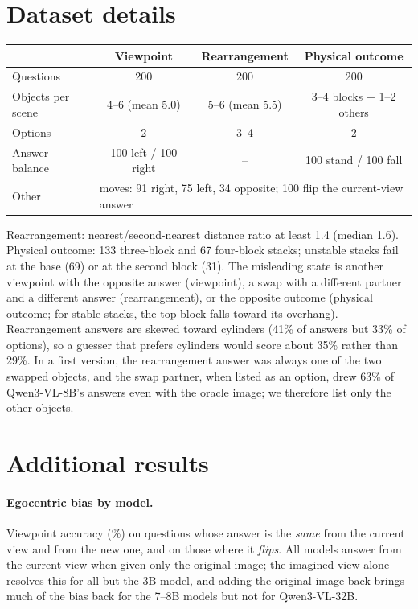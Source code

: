 \section{Dataset details}
\label{sec:supp-data}
\begin{table}[h]
\centering\small
\begin{tabular}{lccc}
\toprule
 & Viewpoint & Rearrangement & Physical outcome \\
\midrule
Questions & 200 & 200 & 200 \\
Objects per scene & 4--6 (mean 5.0) & 5--6 (mean 5.5) & 3--4 blocks + 1--2 others \\
Options & 2 & 3--4 & 2 \\
Answer balance & 100 left / 100 right & -- & 100 stand / 100 fall \\
Other & \multicolumn{3}{l}{\footnotesize moves: 91 right, 75 left, 34 opposite; 100 flip the current-view answer} \\
\bottomrule
\end{tabular}
\end{table}
\noindent Rearrangement: nearest/second-nearest distance ratio at least 1.4 (median 1.6). Physical outcome: 133 three-block and 67 four-block stacks; unstable stacks fail at the base (69) or at the second block (31). The misleading state is another viewpoint with the opposite answer (viewpoint), a swap with a different partner and a different answer (rearrangement), or the opposite outcome (physical outcome; for stable stacks, the top block falls toward its overhang). Rearrangement answers are skewed toward cylinders (41\% of answers but 33\% of options), so a guesser that prefers cylinders would score about 35\% rather than 29\%. In a first version, the rearrangement answer was always one of the two swapped objects, and the swap partner, when listed as an option, drew 63\% of Qwen3-VL-8B's answers even with the oracle image; we therefore list only the other objects.

\section{Additional results}
\label{sec:supp-results}

\paragraph{Egocentric bias by model.} Viewpoint accuracy (\%) on questions whose answer is the \emph{same} from the current view and from the new one, and on those where it \emph{flips}. All models answer from the current view when given only the original image; the imagined view alone resolves this for all but the 3B model, and adding the original image back brings much of the bias back for the 7--8B models but not for Qwen3-VL-32B.
\begin{center}\small\end{center}

